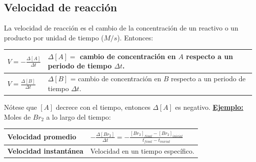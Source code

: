     \subsection{Velocidad de reacción}
        \sangria{} La velocidad de reacción es el cambio de la concentración de un reactivo o un producto por unidad de tiempo ($M/s$).
        Entonces:
        \begin{center} \begin{tabular}{|m{2cm}|m{5cm}|} \toprule \multicolumn{1}{m{2cm}}{$V = - \frac{\Delta [A]}{\Delta t}$} & \multicolumn{1}{m{5cm}}{$\Delta [A] =$ cambio de concentración en $A$ respecto a un periodo de tiempo $\Delta t$.} \\ \midrule \midrule \multicolumn{1}{m{2cm}}{$V = \frac{\Delta [B]}{\Delta t}$} & \multicolumn{1}{m{5cm}}{$\Delta [B]$ = cambio de concentración en $B$ respecto a un periodo de tiempo $\Delta t$.} \\ \bottomrule \end{tabular} \end{center} 
        \sangria{} Nótese que $[A]$ decrece con el tiempo, entonces $\Delta [A]$ es negativo. 
        \textbf{\underline{Ejemplo:}} \\[5pt]  \columnbreak{}   \vspace{5pt}  Moles de $Br_2$ a lo largo del tiempo: 
        \begin{center} \begin{tabular}{|m{1.5cm}|m{6.5cm}|} \toprule \multicolumn{1}{|m{2cm}|}{\textbf{Velocidad promedio}} & \multicolumn{1}{m{6cm}|}{$-\frac{\Delta [Br_2]}{\Delta t} = - \frac{[Br_2]_{final} - [Br_2]_{inicial}}{t_{final} - t_{inicial}}$} \\ \midrule \multicolumn{1}{|m{2cm}|}{\textbf{Velocidad instantánea}} & \multicolumn{1}{m{6cm}|}{Velocidad en un tiempo específico.} \\ \bottomrule \end{tabular} \end{center} 
